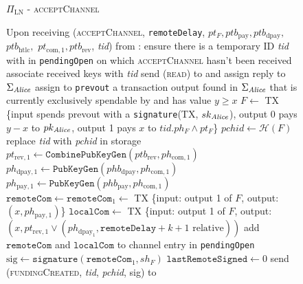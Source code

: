 \begin{figure}[!htbp]
  \begin{protocolbox}{$\Pi_{\mathrm{LN}}$ - \textsc{acceptChannel}}
    \begin{algorithmic}[1]
      \State Upon receiving (\textsc{acceptChannel}, \texttt{remoteDelay},
      $pt_F, ptb_{\mathrm{pay}}, ptb_{\mathrm{dpay}},$ $ptb_{\mathrm{htlc}},$
      $pt_{\mathrm{com}, 1}, ptb_{\mathrm{rev}}$, \textit{tid}) from \bob:
      \Indent
        \State ensure there is a temporary ID \textit{tid} with \bob{} in
        \texttt{pendingOpen} on which \textsc{acceptChannel} hasn't been
        received
        \State associate received keys with \textit{tid}
        \State send (\textsc{read}) to \ledger{} and assign reply to
        $\Sigma_{\mathit{Alice}}$
        \State assign to \texttt{prevout} a transaction output found in
        $\Sigma_{\mathit{Alice}}$ that is currently exclusively spendable by \alice{}
        and has value $y \geq x$
        \State $F \gets$ TX \{input spends prevout with a \texttt{signature}(TX,
        $sk_{\mathit{Alice}}$), output 0 pays $y - x$ to $pk_{\mathit{Alice}}$, output 1 pays
        $x$ to $\textit{tid}.ph_F \wedge pt_F$\}
        \State $\mathit{pchid} \gets \mathcal{H}\left(F\right)$
        \State replace \textit{tid} with \textit{pchid} in storage
        \State $pt_{\mathrm{rev}, 1} \gets
        \mathtt{CombinePubKeyGen}\left(ptb_{\mathrm{rev}}, ph_{\mathrm{com},
        1}\right)$
        \State $ph_{\mathrm{dpay}, 1} \gets
        \texttt{PubKeyGen}\left(phb_{\mathrm{dpay}}, ph_{\mathrm{com},
        1}\right)$
        \State $ph_{\mathrm{pay}, 1} \gets
        \texttt{PubKeyGen}\left(phb_{\mathrm{pay}}, ph_{\mathrm{com}, 1}\right)$
        \State $\mathtt{remoteCom} \gets \mathtt{remoteCom}_1 \gets$ TX \{input:
        output 1 of $F$, output: $\left(x, ph_{\mathrm{pay}, 1}\right)$\}
        \State $\mathtt{localCom} \gets$ TX \{input: output 1 of $F$, output:
        $\left(x, pt_{\mathrm{rev}, 1} \vee \left(ph_{\mathrm{dpay}_1},
        \mathtt{remoteDelay} + k + 1 \text{ relative}\right)\right)$
        \State add $\mathtt{remoteCom}$ and $\mathtt{localCom}$ to channel entry
        in \texttt{pendingOpen}
        \State $\mathrm{sig} \gets \mathtt{signature}\left(\mathtt{remoteCom}_1,
        sh_F\right)$
        \State $\mathtt{lastRemoteSigned} \gets 0$
        \State send (\textsc{fundingCreated}, \textit{tid},
        \textit{pchid}, sig) to \bob{}
      \EndIndent
    \end{algorithmic}
  \end{protocolbox}
  \caption{}
  \label{alg:protocol:open:acceptChannel}
\end{figure}

